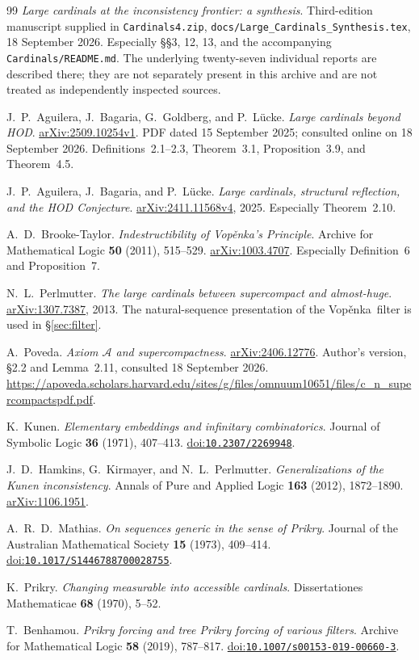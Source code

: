 \documentclass[11pt,letterpaper]{article}
\theoremstyle{definition}
\numberwithin{equation}{section}
\newcommand{\arxiv}[1]{\href{https://arxiv.org/abs/#1}{arXiv:#1}}
\newcommand{\doi}[1]{\href{https://doi.org/#1}{doi:\nolinkurl{#1}}}
\newcommand{\Vop}{Vop\v{e}nka}
\begin{document}
\begin{thebibliography}{99}
\footnotesize
\setlength{\itemsep}{2pt}
\setlength{\parskip}{0pt}
\emph{Large cardinals at the inconsistency frontier: a synthesis}.
Third-edition manuscript supplied in \nolinkurl{Cardinals4.zip},
\nolinkurl{docs/Large_Cardinals_Synthesis.tex}, 18 September 2026.
Especially \S\S3, 12, 13, and the accompanying \nolinkurl{Cardinals/README.md}.
The underlying twenty-seven individual reports are described there; they are not separately present in this archive and are not treated as independently inspected sources.

J.~P.~Aguilera, J.~Bagaria, G.~Goldberg, and P.~L\"ucke.
\emph{Large cardinals beyond HOD}.
\arxiv{2509.10254v1}.
PDF dated 15 September 2025; consulted online on 18 September 2026.
Definitions~2.1--2.3, Theorem~3.1, Proposition~3.9, and Theorem~4.5.

J.~P.~Aguilera, J.~Bagaria, and P.~L\"ucke.
\emph{Large cardinals, structural reflection, and the HOD Conjecture}.
\arxiv{2411.11568v4}, 2025.
Especially Theorem~2.10.

A.~D.~Brooke-Taylor.
\emph{Indestructibility of \Vop's Principle}.
Archive for Mathematical Logic \textbf{50} (2011), 515--529.
\arxiv{1003.4707}.
Especially Definition~6 and Proposition~7.

N.~L.~Perlmutter.
\emph{The large cardinals between supercompact and almost-huge}.
\arxiv{1307.7387}, 2013.
The natural-sequence presentation of the \Vop\ filter is used in \S\ref{sec:filter}.

A.~Poveda.
\emph{Axiom $\mathcal A$ and supercompactness}.
\arxiv{2406.12776}.
Author's version, \S2.2 and Lemma~2.11, consulted 18 September 2026.
\url{https://apoveda.scholars.harvard.edu/sites/g/files/omnuum10651/files/c_n_supercompactspdf.pdf}.

K.~Kunen.
\emph{Elementary embeddings and infinitary combinatorics}.
Journal of Symbolic Logic \textbf{36} (1971), 407--413.
\doi{10.2307/2269948}.

J.~D.~Hamkins, G.~Kirmayer, and N.~L.~Perlmutter.
\emph{Generalizations of the Kunen inconsistency}.
Annals of Pure and Applied Logic \textbf{163} (2012), 1872--1890.
\arxiv{1106.1951}.

A.~R.~D.~Mathias.
\emph{On sequences generic in the sense of Prikry}.
Journal of the Australian Mathematical Society \textbf{15} (1973), 409--414.
\doi{10.1017/S1446788700028755}.

K.~Prikry.
\emph{Changing measurable into accessible cardinals}.
Dissertationes Mathematicae \textbf{68} (1970), 5--52.

T.~Benhamou.
\emph{Prikry forcing and tree Prikry forcing of various filters}.
Archive for Mathematical Logic \textbf{58} (2019), 787--817.
\doi{10.1007/s00153-019-00660-3}.
\end{thebibliography}
\end{document}
